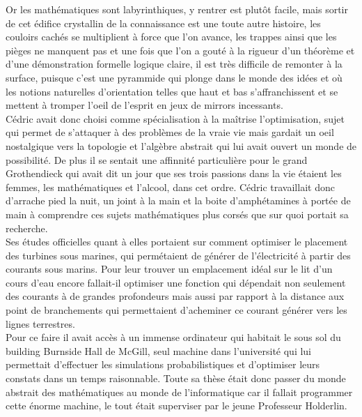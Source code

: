\documentclass{article}
\begin{document}
Or les mathématiques sont labyrinthiques, y rentrer est plutôt facile, mais sortir
de cet édifice crystallin de la connaissance est une toute autre histoire, les couloirs
cachés se multiplient à force que l'on avance, les trappes ainsi que les pièges
ne manquent pas et une fois que l'on a gouté à la rigueur d'un théorème et d'une
démonstration formelle logique claire, il est très difficile de remonter à la
surface, puisque c'est une pyrammide qui plonge dans le monde des idées et où
les notions naturelles d'orientation telles que haut et bas s'affranchissent et
se mettent à tromper l'oeil de l'esprit en jeux de mirrors incessants.\\


Cédric avait donc choisi comme spécialisation à la maîtrise l'optimisation,
sujet qui permet de s'attaquer à des problèmes de la vraie vie mais gardait un
oeil nostalgique vers la topologie et l'algèbre abstrait qui lui avait ouvert un
monde de possibilité. De plus il se sentait une affinnité particulière pour le
grand Grothendieck qui avait dit un jour que ses trois passions dans la vie
étaient les femmes, les mathématiques et l'alcool, dans cet ordre. Cédric
travaillait donc d'arrache pied la nuit, un joint à la main et la boite
d'amphétamines à portée de main à comprendre ces sujets mathématiques plus
corsés que sur quoi portait sa recherche. \\

Ses études officielles quant à elles portaient sur comment optimiser le
placement des turbines sous marines, qui permétaient de générer de l'électricité
à partir des courants sous marins. Pour leur trouver un emplacement idéal sur le
lit d'un cours d'eau encore fallait-il optimiser une fonction qui dépendait non
seulement des courants à de grandes profondeurs mais aussi par rapport à la
distance aux point de branchements qui permettaient d'acheminer ce courant
générer vers les lignes terrestres. \\

Pour ce faire il avait accès à un immense ordinateur qui habitait le sous sol du
building Burnside Hall de McGill, seul machine dans l'université qui lui
permettait d'effectuer les simulations probabilistiques et d'optimiser leurs
constats dans un temps raisonnable. Toute sa thèse était donc passer du monde
abstrait des mathématiques au monde de l'informatique car il fallait programmer
cette énorme machine, le tout était superviser par le jeune Professeur
Holderlin.\\
\end{document}
